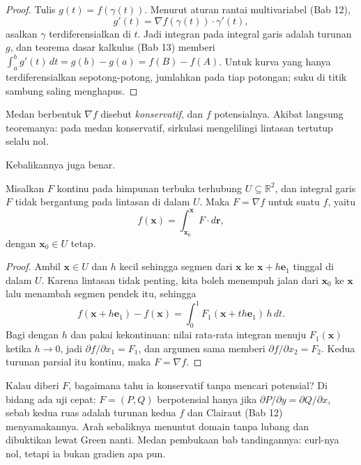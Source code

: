 \begin{proof}
Tulis $g(t)=f(\gamma(t))$. Menurut aturan rantai multivariabel (Bab 12),
\[
g'(t)=\nabla f(\gamma(t))\cdot\gamma'(t),
\]
asalkan $\gamma$ terdiferensialkan di $t$. Jadi integran pada integral garis
adalah turunan $g$, dan teorema dasar kalkulus (Bab 13) memberi
$\int_{a}^{b}g'(t)\,dt=g(b)-g(a)=f(B)-f(A)$. Untuk kurva yang hanya
terdiferensialkan sepotong-potong, jumlahkan pada tiap potongan; suku di titik
sambung saling menghapus.
\end{proof}

Medan berbentuk $\nabla f$ disebut \emph{konservatif}, dan $f$ potensialnya.
Akibat langsung teoremanya: pada medan konservatif, sirkulasi mengelilingi
lintasan tertutup selalu nol.

Kebalikannya juga benar.

\begin{teorema}[Kebalikan]
Misalkan $F$ kontinu pada himpunan terbuka terhubung
$U\subseteq\mathbb{R}^{2}$, dan integral garis $F$ tidak bergantung pada
lintasan di dalam $U$. Maka $F=\nabla f$ untuk suatu $f$, yaitu
\[
f(\mathbf{x})=\int_{\mathbf{x}_{0}}^{\mathbf{x}}F\cdot d\mathbf{r},
\]
dengan $\mathbf{x}_{0}\in U$ tetap.
\end{teorema}

\begin{proof}
Ambil $\mathbf{x}\in U$ dan $h$ kecil sehingga segmen dari $\mathbf{x}$ ke
$\mathbf{x}+h\mathbf{e}_{1}$ tinggal di dalam $U$. Karena lintasan tidak
penting, kita boleh menempuh jalan dari $\mathbf{x}_{0}$ ke $\mathbf{x}$ lalu
menambah segmen pendek itu, sehingga
\[
f(\mathbf{x}+h\mathbf{e}_{1})-f(\mathbf{x})
=\int_{0}^{1}F_{1}(\mathbf{x}+th\mathbf{e}_{1})\,h\,dt .
\]
Bagi dengan $h$ dan pakai kekontinuan: nilai rata-rata integran menuju
$F_{1}(\mathbf{x})$ ketika $h\to0$, jadi $\partial f/\partial x_{1}=F_{1}$,
dan argumen sama memberi $\partial f/\partial x_{2}=F_{2}$. Kedua turunan
parsial itu kontinu, maka $F=\nabla f$.
\end{proof}

Kalau diberi $F$, bagaimana tahu ia konservatif tanpa mencari potensial? Di
bidang ada uji cepat: $F=(P,Q)$ berpotensial hanya jika $\partial P/\partial
y=\partial Q/\partial x$, sebab kedua ruas adalah turunan kedua $f$ dan Clairaut
(Bab 12) menyamakannya. Arah sebaliknya menuntut domain tanpa lubang dan
dibuktikan lewat Green nanti. Medan pembukaan bab tandingannya: curl-nya nol,
tetapi ia bukan gradien apa pun.

